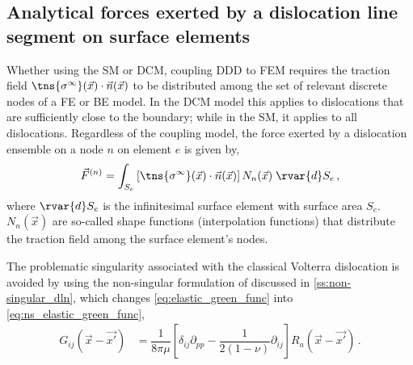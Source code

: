 \subsection{Analytical forces exerted by a dislocation line segment on surface elements}
\label{ss:analytic_forces}

Whether using the SM or DCM, coupling DDD to FEM requires the traction field $ \tns{\sigma^{\infty}}(\vec{x}) \cdot \vec{n}(\vec{x}) $ to be distributed among the set of relevant discrete nodes of a FE or BE model. In the DCM model this applies to dislocations that are sufficiently close to the boundary; while in the SM, it applies to all dislocations.
Regardless of the coupling model, the force exerted by a dislocation ensemble on a node $ n $ on element $ e $ is given by,
\begin{align}\label{eq:ddd_fem_force_intro}
    \vec{F}^{(n)} = \int_{S_{e}} \left[\tns{\sigma^{\infty}}(\vec{x}) \cdot \vec{n}(\vec{x})\right] N_{n}(\vec{x})\; \rvar{d}S_{e}\,,
\end{align}
where $ \rvar{d}S_{e} $ is the infinitesimal surface element with surface area $ S_{e} $. $ N_{n}(\vec{x}) $ are so-called shape functions (interpolation functions) that distribute the traction field among the surface element's nodes.

The problematic singularity associated with the classical Volterra dislocation is avoided by using the non-singular formulation of \citet{a_non-singular_continuum_theory_of_dislocations} discussed in \cref{ss:non-singular_dln}, which changes \cref{eq:elastic_green_func} into \cref{eq:ns_elastic_green_func},
\begin{align}\label{eq:ns_elastic_green_func}
    G_{ij}(\vec{x} - \vec{x'}) & = \dfrac{1}{8\pi \mu}\left[ \delta_{ij} \partial_{pp} - \dfrac{1}{2(1-\nu)} \partial_{ij} \right] R_{a}(\vec{x} - \vec{x'})\,.
\end{align}

